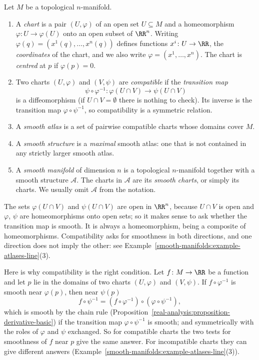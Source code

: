\begin{definition}\label{smooth-manifolds:definition-manifold}
Let $M$ be a topological $n$-manifold.
\begin{enumerate}
\item A \emph{chart} is a pair $(U, \varphi)$ of an open set $U \subseteq M$ and a homeomorphism $\varphi \colon U \to \varphi(U)$ onto an open subset of
$\RR^n$. Writing $\varphi(q) = (x^1(q), \ldots, x^n(q))$ defines functions $x^i \colon U \to \RR$, the \emph{coordinates} of the chart, and we also write
$\varphi = (x^1, \ldots, x^n)$. The chart is \emph{centred} at $p$ if $\varphi(p) = 0$.
\item Two charts $(U, \varphi)$ and $(V, \psi)$ are \emph{compatible} if the \emph{transition map}
\[
\psi \circ \varphi^{-1} \colon \varphi(U \cap V) \to \psi(U \cap V)
\]
is a diffeomorphism (if $U \cap V = \emptyset$ there is nothing to check). Its inverse is the transition map $\varphi \circ \psi^{-1}$, so compatibility is a
symmetric relation.
\item A \emph{smooth atlas} is a set of pairwise compatible charts whose domains cover $M$.
\item A \emph{smooth structure} is a \emph{maximal} smooth atlas: one that is not contained in any strictly larger smooth atlas.
\item A \emph{smooth manifold} of dimension $n$ is a topological $n$-manifold together with a smooth structure $\mathcal{A}$. The charts in $\mathcal{A}$ are
its \emph{smooth charts}, or simply its charts. We usually omit $\mathcal{A}$ from the notation.
\end{enumerate}
\end{definition}

The sets $\varphi(U \cap V)$ and $\psi(U \cap V)$ are open in $\RR^n$, because $U \cap V$ is open and $\varphi$, $\psi$ are homeomorphisms onto open sets; so it
makes sense to ask whether the transition map is smooth. It is always a homeomorphism, being a composite of homeomorphisms. Compatibility asks for smoothness in
both directions, and one direction does not imply the other: see Example~\ref{smooth-manifolds:example-atlases-line}(3).

\begin{remark}\label{smooth-manifolds:remark-why-compatible}
Here is why compatibility is the right condition. Let $f \colon M \to \RR$ be a function and let $p$ lie in the domains of two charts $(U, \varphi)$ and
$(V, \psi)$. If $f \circ \varphi^{-1}$ is smooth near $\varphi(p)$, then near $\psi(p)$
\[
f \circ \psi^{-1} = (f \circ \varphi^{-1}) \circ (\varphi \circ \psi^{-1}),
\]
which is smooth by the chain rule (Proposition~\ref{real-analysis:proposition-derivative-basic}) if the transition map $\varphi \circ \psi^{-1}$ is smooth; and
symmetrically with the roles of $\varphi$ and $\psi$ exchanged. So for compatible charts the two tests for smoothness of $f$ near $p$ give the same answer.
For incompatible charts they can give different answers (Example~\ref{smooth-manifolds:example-atlases-line}(3)).
\end{remark}


